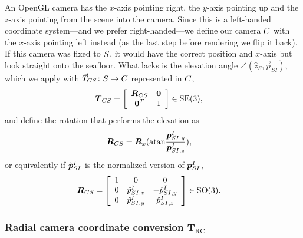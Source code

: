 An OpenGL camera has the $x$-axis pointing right, the $y$-axis pointing up and the $z$-axis pointing from the scene into the camera.
%
Since this is a left-handed coordinate system---and we prefer right-handed---we define our camera $\ubar{C}$ with the $x$-axis pointing left instead (as the last step before rendering we flip it back).
%
If this camera was fixed to $\ubar{S}$, it would have the correct position and $x$-axis but look straight onto the seafloor. What lacks is the elevation angle $\angle(\hat{z}_S,\vec{p}_{SI})$, which we apply with $\vec{T}_{CS}\colon \udot{S}\to\udot{C}$ represented in $\ubar{C}$,
%
%
%
\begin{align}
\dvec{T}_{CS} &= 
\left[\begin{array}{c c}
 \mat{R}_{CS}  & \dvec{0} \\%
 \dvec{0}^T  &  1
\end{array}\right] \in \mathrm{SE}(3), \label{eq_T_CS}
\end{align}
%
and define the rotation that performs the elevation as
%
\begin{align}
\dvec{R}_{CS} &= \mat{R}_x(\mathrm{atan}\frac{\dvec{p}_{SI,y}^I}{\dvec{p}_{SI,z}^I}),\label{eq_R_CS_angle}
\end{align}
%
or equivalently if $\hat{\boldsymbol{p}}_{SI}^I$ is the normalized version of $\boldsymbol{p}_{SI}^I$,
%
\begin{align}
\dvec{R}_{CS} &=
\left[\begin{array}{c c c}
 1 & 0                 & 0                 \\%
 0 & \hat{{p}}_{SI,z}^I & -\hat{{p}}_{SI,y}^I \\
 0 & \hat{{p}}_{SI,y}^I &  \hat{{p}}_{SI,z}^I 
\end{array}\right] \in \mathrm{SO}(3). \label{eq_R_CS_coordinate}
\end{align}


\subsubsection{Radial camera coordinate conversion T$_{\mathrm{RC}}$}\label{IV_sec_radial_camera}


